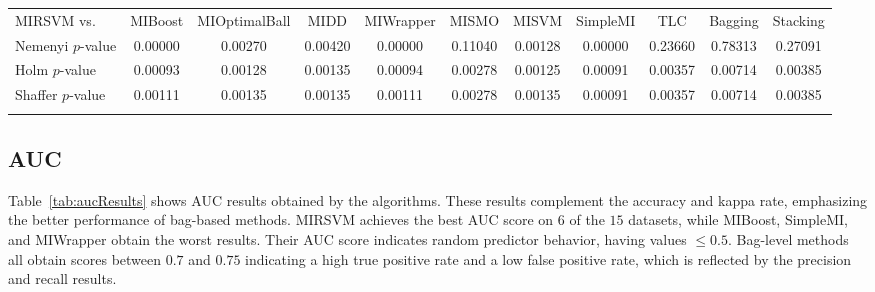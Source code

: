 \begin{table}[H]
{}
\label{fig:BonfDunnauc}
\vspace{0.5cm}
\label{tab:statauc}
\scriptsize
\begin{tabularx}{\textwidth}{lcccccccccc}\noalign{\smallskip}\hline\noalign{\smallskip}
MIRSVM vs. & MIBoost & MIOptimalBall & MIDD & MIWrapper & MISMO & MISVM & SimpleMI & TLC & Bagging & Stacking\\
\noalign{\smallskip}\hline\noalign{\smallskip}
Nemenyi $p$-value & 0.00000 & 0.00270 & 0.00420 & 0.00000 & 0.11040 & 0.00128 & 0.00000 & 0.23660 & 0.78313 & 0.27091\\
Holm $p$-value & 0.00093 & 0.00128 & 0.00135 & 0.00094 & 0.00278 & 0.00125 & 0.00091 & 0.00357 & 0.00714 & 0.00385\\
Shaffer $p$-value & 0.00111 & 0.00135 & 0.00135 & 0.00111 & 0.00278 & 0.00135 & 0.00091 & 0.00357 & 0.00714 & 0.00385\\
\noalign{\smallskip}\hline\noalign{\smallskip}
\end{tabularx}
\end{table}

\newpage
\subsection{AUC}
Table~\ref{tab:aucResults} shows AUC results obtained by the algorithms. These results complement the accuracy and kappa rate, emphasizing the better performance of bag-based methods. MIRSVM achieves the best AUC score on $6$ of the $15$ datasets, while MIBoost, SimpleMI, and MIWrapper obtain the worst results. Their AUC score indicates random predictor behavior, having values $\leq 0.5$. Bag-level methods all obtain scores between $0.7$ and $0.75$ indicating a high true positive rate and a low false positive rate, which is reflected by the precision and recall results. 

